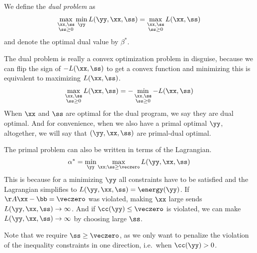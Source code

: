 \begin{definition}
We define the \emph{dual problem} as
\begin{align}
  \label{eq:dualprob}
  \max_{\substack{\xx, \ss \\ \ss \geq 0}}
  \min_{\yy}L(\yy, \xx, \ss)
  =
  \max_{\substack{\xx, \ss \\ \ss \geq 0}} L(\xx,  \ss)
  \end{align}
and denote the optimal dual value by $\beta^*$.
\end{definition}

The dual problem is really a convex optimization
problem in disguise, because we can flip the sign of $-L(\xx,  \ss)$
to get a convex function and minimizing this is equivalent to
maximizing $L(\xx,  \ss)$.
\begin{align*}
  \max_{\substack{\xx, \ss \\ \ss \geq 0}} L(\xx,  \ss)
  =
  -
  \min_{\substack{\xx, \ss \\ \ss \geq 0}} -L(\xx,  \ss)
\end{align*}
When $\xx$ and $\ss$ are optimal for the dual program, we
say they are dual optimal. And for convenience, when we also have a
primal optimal $\yy$, altogether, we will say that $(\yy,\xx,\ss)$ are
primal-dual optimal.


The primal problem can also be written in terms of the Lagrangian.
\begin{equation}
  \label{eq:primalminmax}
  \alpha^* = \min_{\yy}\max_{\xx; \ss\geq\veczero} L(\yy, \xx, \ss)
\end{equation}
This is because for a minimizing $\yy$ all constraints have to be satisfied and the Lagrangian simplifies to $L(\yy,\xx,\ss) = \energy(\yy)$.
If $\AA\xx - \bb = \veczero$ was violated, making $\xx$ large sends $L(\yy,\xx,\ss) \rightarrow \infty$.
And if $\cc(\yy) \leq \veczero$ is violated, we can make $L(\yy,\xx,\ss) \rightarrow \infty$ by choosing large $\ss$.

Note that we require $\ss \geq \veczero$, as we only want to penalize the violation of the inequality constraints in one direction, i.e.\ when $\cc(\yy) > 0$.

